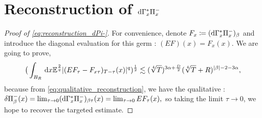 \section{Reconstruction of $\mathrm{d}\Gamma^*_x \Pi^-_x$}

\begin{proof}[Proof of \eqref{eq:reconstruction_dPi-}]
    For convenience, denote $F_x \coloneq (\mathrm{d}\Gamma^*_x \Pi^-_x)_{\beta}$ and introduce the diagonal evaluation for this germ : $(EF)(x) = F_x (x).$
    We are going to prove,
    \begin{equation}
        \big(\int_{B_R} \,\mathrm{d} x \mathbb{E}^{\frac{2}{q}} \lvert(EF_\tau - F_{x\tau})_{T-\tau}(x)\rvert^q)^{\frac{1}{2}} \lesssim (\sqrt[4]{T})^{3\alpha + \frac{D}{2}}(\sqrt[4]{T} + R)^{\lvert\beta\rvert-2-3\alpha}, \label{eq:diagrec}
    \end{equation}
    because from \eqref{eq:qualitative_reconstruction}, we have the qualitative : $\delta \Pi^-_\beta (x)= \lim_{\tau \rightarrow 0} (\mathrm{d}\Gamma^*_x \Pi^-_x)_{\beta \tau}(x) = \lim_{\tau \rightarrow 0} EF_\tau (x),$ so taking the limit $\tau \rightarrow 0$, we hope to recover the targeted estimate.


\end{proof}
